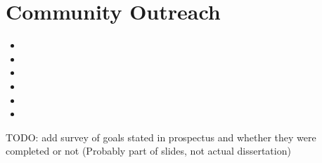 
\chapter{Community Outreach}


\begin{itemize} 
        \item {}
        \item {}
        \item {}     
        \item {}
        \item {}              
        \item {}
\end{itemize}
TODO: add survey of goals stated in prospectus and whether they were completed or not (Probably part of slides, not actual dissertation)
